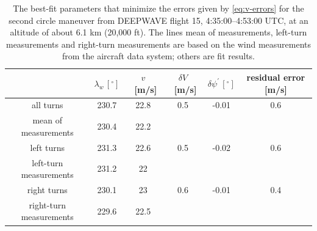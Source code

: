 \documentclass[12pt,twoside,english]{article}\usepackage[]{graphicx}\usepackage[]{color}
\providecommand{\tabularnewline}{\\}
\begin{document}
\begin{center}
\begin{table}[H] 
\begin{centering}
\begin{tabular}{cccccc}
\toprule%
 & $\lambda_w\,[^{\circ}]$  & $v$~{[}m/s{]}  & $\delta V$~{[}m/s{]}  & $\delta\psi^{\prime}\,[^{\circ}]$  & residual error {[}m/s{]}\tabularnewline 
\midrule 
\midrule  all turns & 230.7 & 22.8 & 0.5 & -0.01 & 0.6\tabularnewline 
\midrule  mean of measurements & 230.4 & 22.2 &  &  & \tabularnewline 
\midrule  left turns & 231.3 & 22.6 & 0.5 & -0.02 & 0.6\tabularnewline 
\midrule  left-turn measurements & 231.2 & 22 &  & & \tabularnewline 
\midrule  right turns & 230.1 & 23 & 0.6 & -0.01 & 0.4\tabularnewline 
\midrule  right-turn measurements & 229.6 & 22.5 &  & & \tabularnewline 
\bottomrule 
\end{tabular}
\par\end{centering}

\protect\caption[The best-fit parameters that minimize the errors given by \eqref{eq:v-errors} for the second circle maneuver from DEEPWAVE flight 15.]{The best-fit parameters that minimize the errors given by \eqref{eq:v-errors} for the second circle maneuver from DEEPWAVE flight 15, 4:35:00--4:53:00 UTC, at an altitude of about 6.1 km (20,000 ft). The lines \textquotedbl{}mean of measurements\textquotedbl{}, \textquotedbl{}left-turn measurements\textquotedbl{} and \textquotedbl{}right-turn measurements\textquotedbl{} are based on the wind measurements from the aircraft data system; others are fit results.\label{tab:GS2min}}
\end{table}

\par\end{center}
\end{document}

